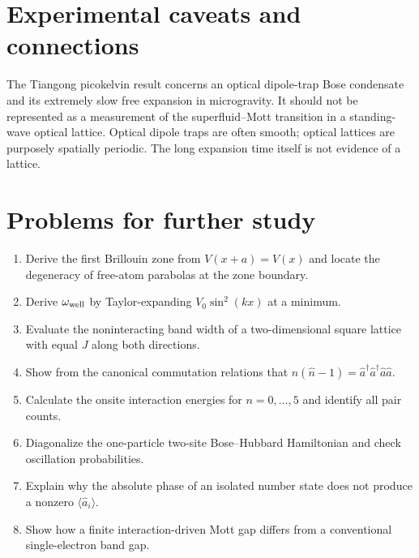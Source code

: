 \documentclass[11pt,a4paper]{article}
\begin{document}
\section{Experimental caveats and connections}
The Tiangong picokelvin result concerns an optical dipole-trap Bose condensate and its extremely slow free expansion in microgravity. It should not be represented as a measurement of the superfluid--Mott transition in a standing-wave optical lattice. Optical dipole traps are often smooth; optical lattices are purposely spatially periodic. The long expansion time itself is not evidence of a lattice.
\section{Problems for further study}
\begin{enumerate}[label=\textbf{P\arabic*.}]
\item Derive the first Brillouin zone from $V(x+a)=V(x)$ and locate the degeneracy of free-atom parabolas at the zone boundary.
\item Derive $\omega_{\rm well}$ by Taylor-expanding $V_0\sin^2(kx)$ at a minimum.
\item Evaluate the noninteracting band width of a two-dimensional square lattice with equal $J$ along both directions.
\item Show from the canonical commutation relations that $\hat n(\hat n-1)=\hat a^\dagger\hat a^\dagger\hat a\hat a$.
\item Calculate the onsite interaction energies for $n=0,\ldots,5$ and identify all pair counts.
\item Diagonalize the one-particle two-site Bose--Hubbard Hamiltonian and check oscillation probabilities.
\item Explain why the absolute phase of an isolated number state does not produce a nonzero $\langle\hat a_i\rangle$.
\item Show how a finite interaction-driven Mott gap differs from a conventional single-electron band gap.
\end{enumerate}
\end{document}
